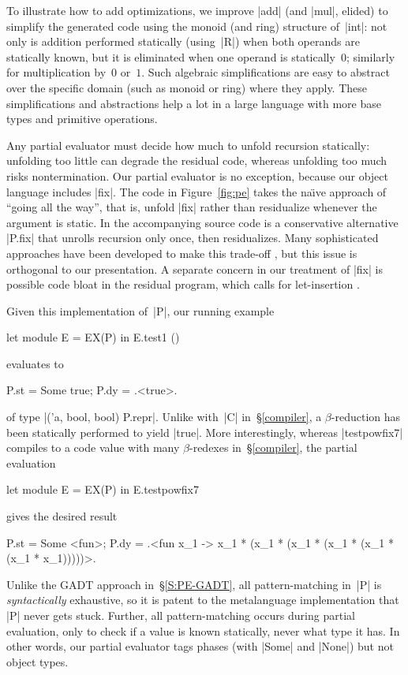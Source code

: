 \documentclass[preprint]{sigplanconf}
\begin{document}
To illustrate how to add optimizations, we improve |add| (and |mul|,
elided) to simplify the generated code using the monoid (and ring)
structure of~|int|: not only is addition performed statically
(using~|R|) when both operands are statically known, but it is
eliminated when one operand is statically~$0$; similarly for
multiplication by~$0$ or~$1$.  Such algebraic simplifications are easy
to abstract over the specific domain (such as monoid or ring) where they
apply.  These simplifications and abstractions help a lot in a large
language with more base types and primitive operations.

Any partial evaluator must decide how much to unfold recursion
statically: unfolding too little can degrade the residual code, whereas
unfolding too much risks nontermination.  Our partial evaluator is no
exception, because our object language includes |fix|.  The code in
Figure~\ref{fig:pe} takes the na\"\i ve approach of ``going all the
way'', that is, unfold |fix| rather than residualize whenever the
argument is static.  In the accompanying source code is a conservative
alternative |P.fix| that unrolls recursion only once, then residualizes.
Many sophisticated approaches have been developed to make this trade-off
\citep{jones-partial}, but this issue is orthogonal to our presentation.
A separate concern in our treatment of |fix| is possible code bloat in
the residual program, which calls for let-insertion
\citep{SwadiTahaKiselyovPasalic2006}.

Given this implementation of~|P|, our running example
\begin{code}
let module E = EX(P) in E.test1 ()
\end{code}
evaluates to
\begin{code}
{P.st = Some true; P.dy = .<true>.}
\end{code}
of type |('a, bool, bool) P.repr|.  Unlike with~|C| in~\S\ref{compiler},
a $\beta$-reduction has been statically performed to yield |true|.  More
interestingly, whereas |testpowfix7| compiles to a code value with many
$\beta$-redexes in~\S\ref{compiler}, the partial evaluation
\begin{code}
let module E = EX(P) in E.testpowfix7
\end{code}
gives the desired result
\begin{code}
{P.st = Some <fun>;
 P.dy = .<fun x_1 -> x_1 * (x_1 * (x_1 * (x_1 *
                    (x_1 * (x_1 * x_1)))))>.}
\end{code}

Unlike the GADT approach in~\S\ref{S:PE-GADT}, all pattern\hyp matching
in~|P| is \emph{syntactically} exhaustive, so it is patent to the metalanguage
implementation that |P| never gets stuck.  Further, all pattern\hyp matching occurs
during partial evaluation, only to check if a value is known statically,
never what type it has.  In other words, our partial evaluator tags
phases (with |Some| and |None|) but not object types.
\end{document}
